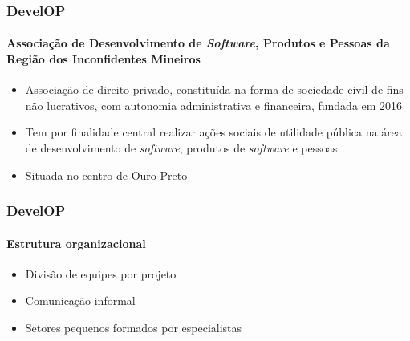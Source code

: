 \documentclass[aspectratio=169]{beamer}
\begin{document}
\begin{frame}
	\frametitle{DevelOP}
	\framesubtitle{Associação de Desenvolvimento de \textit{Software}, Produtos e Pessoas da Região dos Inconfidentes Mineiros}
	
	\begin{itemize}
		
		 \item Associação de direito privado, constituída na forma de sociedade civil de fins não lucrativos, com autonomia administrativa e financeira, fundada em 2016
		 
		 \item Tem por finalidade central realizar ações sociais de utilidade pública na área de desenvolvimento de \textit{software}, produtos de \textit{software} e pessoas \cite{DevelOP:Estatuto}
		 
		 \item Situada no centro de Ouro Preto

	\end{itemize}

\end{frame}


\begin{frame}
	\frametitle{DevelOP}
	\framesubtitle{Estrutura organizacional}
	
	\begin{itemize}
		
		\item Divisão de equipes por projeto
		
		\item Comunicação informal
		
		\item Setores pequenos formados por especialistas
		
	\end{itemize}
	
\end{frame}

\end{document}
